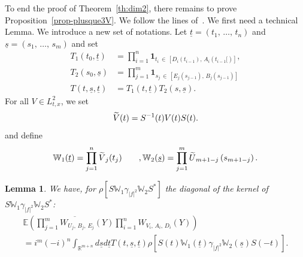 \documentclass[10pt]{amsart}
\newtheorem{lemm}[theo]{Lemma}\newtheorem{prop}[theo]{Proposition}\newtheorem{coro}[theo]{Corollary}\newtheorem{conj}[theo]{Conjecture}
\theoremstyle{definition}\newtheorem{defi}[theo]{Definition}\newtheorem{rema}[theo]{Remark}\newtheorem{exam}[theo]{Example}\newtheorem{exem}[theo]{Example}\newtheorem{nota}[theo]{Notation}
\newcommand{\R}{\mathbb{R}}
\newcommand{\E}{\mathbb{E}}
\newcommand{\bbW}{\mathbb{W}}
\newcommand{\bfun}{\mathbf{1}}
\let\oldtilde\tilde
\renewcommand*{\tilde}[1]{\mathchoice{\widetilde{#1}}{\widetilde{#1}}{\oldtilde{#1}}{\oldtilde{#1}}}
\begin{document}
To end the proof of Theorem~\ref{th:dim2}, there remains to prove Proposition~\ref{prop-plusque3V}. We follow the lines of~\cite{FLLS}. We first need a technical Lemma. We introduce a new set of notations. Let $\underline t=(t_1,\,\dots,\,t_n)$ and $ \underline s=(s_1,\,\dots,\,s_m)$ and set
\begin{align*}
T_1(t_0,\underline t) &= \prod_{i=1}^n \bfun_{t_i\,\in\, \left[D_i\left(t_{i-1}\right),\,A_i\left(t_{i-1}[\right)\right]}, \\
 T_2(s_0,\underline s) &= \prod_{j=1}^m \bfun_{s_j\,\in\, \left[E_j\left(s_{j-1}\right),\,B_j\left(s_{j-1}\right)\right]} \\
 T(t,\underline s,\underline t) &= T_1(t,\underline t)T_2(s,\underline s).
\end{align*}
For all $V \in L^2_{t,x}$, we set
\[
\tilde V (t)= S^{-1}(t) V(t) S(t).
\]
and define
\[
\bbW_1(\underline t) =\prod_{j=1}^n \tilde V_j(t_{j}) \qquad, \bbW_2(\underline s) =\prod_{j=1}^m \tilde U_{m+1-j}\left(s_{m+1-j}\right).
\]

\begin{lemm}\label{lem:comput}
We have, for $\rho \left[S \bbW_1 \gamma_{|f|^2} \bbW_2S^* \right]$ the diagonal of the kernel of $S \bbW_1 \gamma_{|f|^2} \bbW_2S^*$:
\begin{multline*}
\E \left(\overline{\prod_{j=1}^m W_{U_j,\,B_j,\,E_j} (Y)} \prod_{i=1}^n W_{V_i,\,A_i,\,D_i}(Y)\right)\\
 = i^m(-i)^n \int_{\R^{m+n}} d\underline s d\underline t T(t,\underline s,\underline t)\rho \left[S(t) \bbW_1(\underline t) \gamma_{|f|^2} \bbW_2(\underline s)S(-t) \right].
\end{multline*}
\end{lemm}
\end{document}
